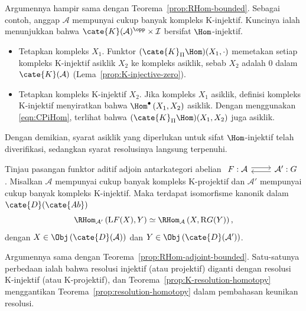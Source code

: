 \begin{bukti}
	Argumennya hampir sama dengan Teorema~\ref{prop:RHom-bounded}. Sebagai
	contoh, anggap $\mathcal{A}$ mempunyai cukup banyak kompleks K-injektif.
	Kuncinya ialah menunjukkan bahwa
	$\cate{K}(\mathcal{A})^{\opp}\times\mathcal{I}$ bersifat
	$\Hom$-injektif.
	\begin{itemize}
		\item Tetapkan kompleks $X_1$. Funktor
		$(\cate{K}_\Pi\Hom)(X_1,\cdot)$ memetakan setiap kompleks K-injektif
		asiklik $X_2$ ke kompleks asiklik, sebab $X_2$ adalah $0$ dalam
		$\cate{K}(\mathcal{A})$ (Lema~\ref{prop:K-injective-zero}).
		\item Tetapkan kompleks K-injektif $X_2$. Jika kompleks $X_1$ asiklik,
		definisi kompleks K-injektif menyiratkan bahwa
		$\Hom^\bullet\left(X_1,X_2\right)$ asiklik. Dengan menggunakan
		\eqref{eqn:CPiHom}, terlihat bahwa
		$(\cate{K}_\Pi\Hom)(X_1,X_2)$ juga asiklik.
	\end{itemize}
	Dengan demikian, syarat asiklik yang diperlukan untuk sifat
	$\Hom$-injektif telah diverifikasi, sedangkan syarat resolusinya langsung
	terpenuhi.
\end{bukti}

\begin{teorema}\label{prop:RHom-adjoint}
	Tinjau pasangan funktor aditif adjoin antarkategori abelian
	$\begin{tikzcd}
		F: \mathcal{A} \arrow[r, shift left] & \mathcal{A}' \arrow[l, shift left] : G
	\end{tikzcd}$.
	Misalkan $\mathcal{A}$ mempunyai cukup banyak kompleks K-projektif dan
	$\mathcal{A}'$ mempunyai cukup banyak kompleks K-injektif. Maka terdapat
	isomorfisme kanonik dalam $\cate{D}(\cate{Ab})$
	\[ \RHom_{\mathcal{A'}}\left(\mathrm{L}F(X), Y\right) \simeq \RHom_{\mathcal{A}}\left(X, \mathrm{R}G(Y) \right), \]
	dengan $X\in\Obj\left(\cate{D}(\mathcal{A})\right)$ dan
	$Y\in\Obj\left(\cate{D}(\mathcal{A}')\right)$.
\end{teorema}
\begin{bukti}
	Argumennya sama dengan Teorema~\ref{prop:RHom-adjoint-bounded}. Satu-satunya
	perbedaan ialah bahwa resolusi injektif (atau projektif) diganti dengan
	resolusi K-injektif (atau K-projektif), dan
	Teorema~\ref{prop:K-resolution-homotopy} menggantikan
	Teorema~\ref{prop:resolution-homotopy} dalam pembahasan keunikan resolusi.
\end{bukti}

